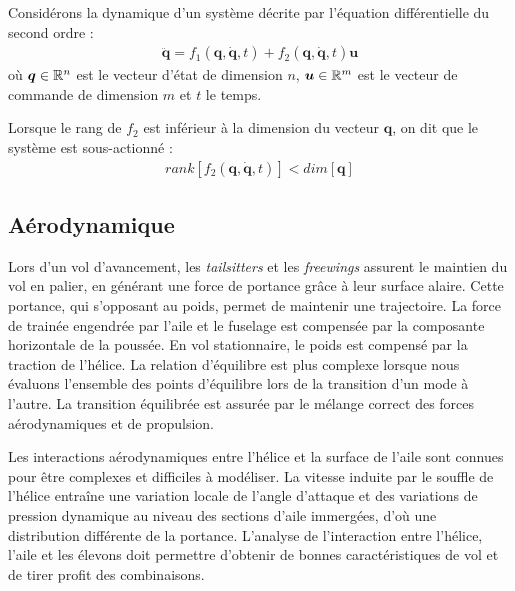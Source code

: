 
    \begin{definition}
        Considérons la dynamique d'un système décrite par l'équation différentielle du second ordre :
        \begin{align*}
            \ddot{\boldsymbol{q}} = f_1(\boldsymbol{q}, \dot{\boldsymbol{q}}, t) + f_2(\boldsymbol{q}, \dot{\boldsymbol{q}}, t) \boldsymbol{u}
        \end{align*}
        où $\boldsymbol{q} \in {\mathbb R}^{n}$ est le vecteur d'état de dimension $n$, $\boldsymbol{u} \in {\mathbb R}^{m}$ est le vecteur de commande de dimension $m$ et $t$ le temps. 

        Lorsque le rang de $f_2$ est inférieur à la dimension du vecteur $\boldsymbol{q}$, on dit que le système est sous-actionné :
        \begin{align*}
            rank[f_2(\boldsymbol{q}, \dot{\boldsymbol{q}}, t)] < dim[\boldsymbol{q}]
        \end{align*}
    \end{definition}

    \subsection{Aérodynamique}

    Lors d'un vol d'avancement, les \textit{tailsitters} et les \textit{freewings} assurent le maintien du vol en palier, en générant une force de portance grâce à leur surface alaire. Cette portance, qui s'opposant au poids, permet de maintenir une trajectoire. La force de trainée engendrée par l'aile et le fuselage est compensée par la composante horizontale de la poussée. En vol stationnaire, le poids est compensé par la traction de l'hélice. La relation d'équilibre est plus complexe lorsque nous évaluons l'ensemble des points d'équilibre lors de la transition d'un mode à l'autre. La transition équilibrée est assurée par le mélange correct des forces aérodynamiques et de propulsion.

    Les interactions aérodynamiques entre l'hélice et la surface de l'aile sont connues pour être complexes et difficiles à modéliser. La vitesse induite par le souffle de l'hélice entraîne une variation locale de l'angle d'attaque et des variations de pression dynamique au niveau des sections d'aile immergées, d'où une distribution différente de la portance. L'analyse de l'interaction entre l'hélice, l'aile et les élevons doit permettre d'obtenir de bonnes caractéristiques de vol et de tirer profit des combinaisons.

